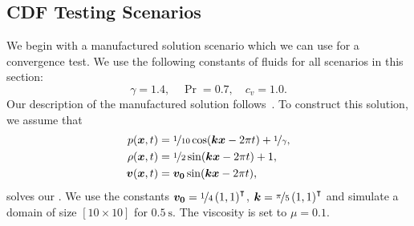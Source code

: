 \documentclass[runningheads]{llncs}
\begin{document}
\subsection{CDF Testing Scenarios}
We begin with a manufactured solution scenario which we can use for a convergence test.
We use the following constants of fluids for all scenarios in this section:
\begin{equation}
  \gamma = 1.4, \quad \Pr = 0.7, \quad c_v = 1.0.
\end{equation}
Our description of the manufactured solution follows~\cite{dumbser2010arbitrary}.
To construct this solution, we assume that
\begin{align}\label{eq:manufactured-solution}
  \begin{split}
    p(\bm{x}, t) &= \nicefrac{1}{10} \cos( \bm{k} \bm{x} - 2 \pi t ) + \nicefrac{1}{\gamma}, \\
    \rho(\bm{x}, t) &= \nicefrac{1}{2} \sin (\bm{k} \bm{x} - 2 \pi t) + 1, \\
    \bm{v}(\bm{x}, t) &= \bm{v_0} \sin(\bm{k} \bm{x} - 2 \pi t),
  \end{split}
  \end{align}
solves our \pde{}.
We use the constants $\bm{v_0} = \nicefrac{1}{4} \left( 1, 1 \right)^\intercal$, $\bm{k} = \nicefrac{\pi}{5} \left( 1, 1 \right)^\intercal$ and simulate a domain of size $\left[ 10 \times 10 \right]$ for $\SI{0.5}{\s}$.
The viscosity is set to $\mu = 0.1$.
\end{document}
